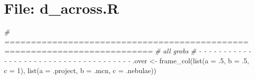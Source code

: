 \documentclass[
]{article}
\newenvironment{Shaded}{\begin{snugshade}}{\end{snugshade}}
\newcommand{\AttributeTok}[1]{\textcolor[rgb]{0.77,0.63,0.00}{#1}}
\newcommand{\CommentTok}[1]{\textcolor[rgb]{0.56,0.35,0.01}{\textit{#1}}}
\newcommand{\DecValTok}[1]{\textcolor[rgb]{0.00,0.00,0.81}{#1}}
\newcommand{\FunctionTok}[1]{\textcolor[rgb]{0.00,0.00,0.00}{#1}}
\newcommand{\NormalTok}[1]{#1}
\newcommand{\OtherTok}[1]{\textcolor[rgb]{0.56,0.35,0.01}{#1}}
\begin{document}
\hypertarget{file-d_across.r-1}{%
\section{File: d\_across.R}\label{file-d_across.r-1}}

\begin{Shaded}
\begin{Highlighting}[]
\CommentTok{\# ==========================================================================}
\CommentTok{\# all grobs}
\CommentTok{\# {-} {-} {-} {-} {-} {-} {-} {-} {-} {-} {-} {-} {-} {-} {-} {-} {-} {-} {-} {-} {-} {-} {-} {-} {-} {-} {-} {-} {-} {-} {-} {-} {-} {-} {-} {-} {-}}
\NormalTok{.over }\OtherTok{\textless{}{-}} \FunctionTok{frame\_col}\NormalTok{(}\FunctionTok{list}\NormalTok{(}\AttributeTok{a =}\NormalTok{ .}\DecValTok{5}\NormalTok{, }\AttributeTok{b =}\NormalTok{ .}\DecValTok{5}\NormalTok{, }\AttributeTok{c =} \DecValTok{1}\NormalTok{),}
                   \FunctionTok{list}\NormalTok{(}\AttributeTok{a =}\NormalTok{ .project, }\AttributeTok{b =}\NormalTok{ .mcn, }\AttributeTok{c =}\NormalTok{ .nebulae))}
\end{Highlighting}
\end{Shaded}
\end{document}
